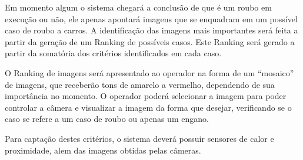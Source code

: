 	Em momento algum o sistema chegará a conclusão de que é um roubo em execução ou não, ele apenas apontará imagens que se enquadram em um possível caso de roubo a carros. A identificação das imagens mais importantes será feita a partir da geração de um Ranking de possíveis casos. Este Ranking será gerado a partir da somatória dos critérios identificados em cada caso.
	
	O Ranking de imagens será apresentado ao operador na forma de um “mosaico” de imagens, que receberão tons de amarelo a vermelho, dependendo de sua importância no momento. O operador poderá selecionar a imagem para poder controlar a câmera e visualizar a imagem da forma que desejar, verificando se o caso se refere a um caso de roubo ou apenas um engano.
	
	Para captação destes critérios, o sistema deverá possuir sensores de calor e proximidade, alem das imagens obtidas pelas câmeras.